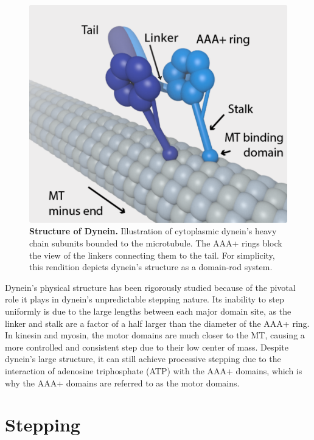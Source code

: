 
\begin{figure}[H]
	\centering
	\includegraphics[width=0.6\columnwidth]{Figures/dynein_on_MT.png}
	\caption[Structure of Dynein]{\textbf{Structure of Dynein.} Illustration of cytoplasmic dynein's heavy chain subunits bounded to the microtubule. The AAA+ rings block the view of the linkers connecting them to the tail. For simplicity, this rendition depicts dynein’s structure as a domain-rod system. \cite{TheTrappistArt}}
	\label{fig:structure}
\end{figure}

Dynein's physical structure has been rigorously studied because of the pivotal role it plays in dynein's unpredictable stepping nature. Its inability to step uniformly is due to the large lengths between each major domain site, as the linker and stalk are a factor of a half larger than the diameter of the AAA+ ring. In kinesin and myosin, the motor domains are much closer to the MT, causing a more controlled and consistent step due to their low center of mass. Despite dynein's large structure, it can still achieve processive stepping due to the interaction of adenosine triphosphate (ATP) with the AAA+ domains, which is why the AAA+ domains are referred to as the motor domains.





\section{Stepping}

